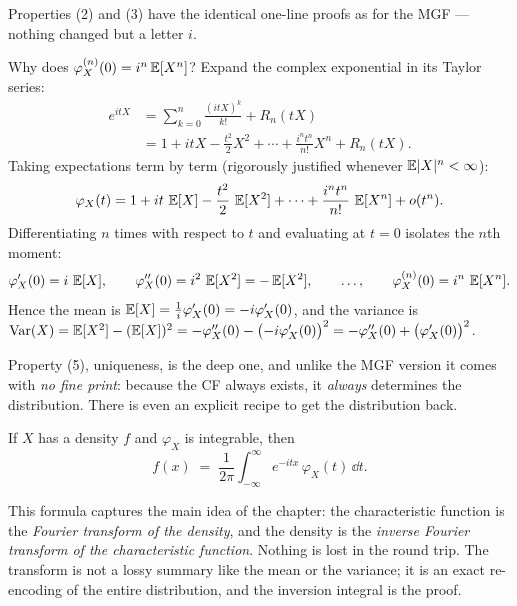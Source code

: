 Properties (2) and (3) have the identical one-line proofs as for the MGF ---
nothing changed but a letter $i$.

\begin{whybox}
Why does $\varphi_X^{(n)}(0) = i^n \operatorname{\mathbb{E}}[X^n]$? Expand the complex exponential in its Taylor series:
\begin{align*}
  e^{itX} &= \sum_{k=0}^n \frac{(itX)^k}{k!} + R_n(tX) \\
          &= 1 + itX - \frac{t^2}{2}X^2 + \cdots + \frac{i^n t^n}{n!}X^n + R_n(tX).
\end{align*}
Taking expectations term by term (rigorously justified whenever $\operatorname{\mathbb{E}}\lvert X\rvert^n < \infty$):
\[
  \varphi_X(t) = 1 + it\,\operatorname{\mathbb{E}}[X] - \frac{t^2}{2}\,\operatorname{\mathbb{E}}[X^2] + \cdots + \frac{i^n t^n}{n!}\,\operatorname{\mathbb{E}}[X^n] + o(t^n).
\]
Differentiating $n$ times with respect to $t$ and evaluating at $t=0$ isolates the $n$th moment:
\[
  \varphi_X'(0) = i\,\operatorname{\mathbb{E}}[X], \qquad \varphi_X''(0) = i^2\,\operatorname{\mathbb{E}}[X^2] = -\operatorname{\mathbb{E}}[X^2], \qquad \dots, \qquad \varphi_X^{(n)}(0) = i^n\,\operatorname{\mathbb{E}}[X^n].
\]
Hence the mean is $\operatorname{\mathbb{E}}[X] = \frac{1}{i}\varphi_X'(0) = -i\varphi_X'(0)$, and the variance is
$\operatorname{Var}(X) = \operatorname{\mathbb{E}}[X^2] - (\operatorname{\mathbb{E}}[X])^2 = -\varphi_X''(0) - \big({-}i\varphi_X'(0)\big)^2 = -\varphi_X''(0) + \big(\varphi_X'(0)\big)^2$.
\end{whybox}

Property (5), uniqueness, is the deep one, and unlike
the MGF version it comes with \emph{no fine print}: because the CF always
exists, it \emph{always} determines the distribution. There is even an explicit
recipe to get the distribution back.

\begin{theorem}
\label{ch18:thm-inversion}
If $X$ has a density $f$ and $\varphi_X$ is integrable, then
\[
  f(x) \;=\; \frac{1}{2\pi}\int_{-\infty}^\infty e^{-itx}\,\varphi_X(t)\,\dd t .
\]
\end{theorem}

This formula captures the main idea of the chapter: the
characteristic function is the \emph{Fourier transform of the density}, and the
density is the \emph{inverse Fourier transform of the characteristic function}.
Nothing is lost in the round trip. The transform is not a lossy summary like the
mean or the variance; it is an exact re-encoding of the entire distribution,
and the inversion integral is the proof.

